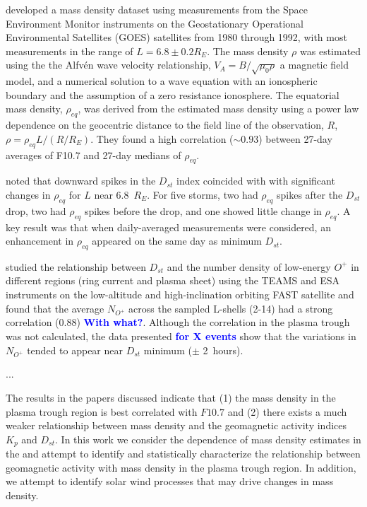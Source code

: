 \documentclass[10pt,twocolumn]{article}
\newcommand{\inote}[1]{\textcolor{blue}{\textbf{#1}}} %
\begin{document}
\cite{Takahashi2010} developed a mass density dataset using measurements from the Space Environment Monitor instruments on the Geostationary Operational Environmental Satellites (GOES) satellites from 1980 through 1992, with most measurements in the range of $L=6.8\pm0.2 R_E$. The mass density $\rho$ was estimated using the the Alfv\'en wave velocity relationship, $V_A=B/\sqrt{\mu_0\rho}$ a magnetic field model, and a numerical solution to a wave equation with an ionospheric boundary and the assumption of a zero resistance ionosphere.  The equatorial mass density, $\rho_{eq}$, was derived from the estimated mass density using a power law dependence on the geocentric distance to the field line of the observation, $R$, $\rho=\rho_{eq}L/(R/R_E)$.  They found a high correlation ($\sim 0.93$) between 27-day averages of F10.7 and 27-day medians of $\rho_{eq}$.

\cite{Takahashi2010} noted that downward spikes in the $D_{st}$ index coincided with with significant changes in $\rho_{eq}$ for $L$ near 6.8~$R_E$. For five storms, two had $\rho_{eq}$ spikes after the $D_{st}$ drop, two had $\rho_{eq}$ spikes before the drop, and one showed little change in $\rho_{eq}$.  A key result was that when daily-averaged measurements were considered, an enhancement in $\rho_{eq}$ appeared on the same day as minimum $D_{st}$.

\cite{Yao2008} studied the relationship between $D_{st}$ and the number density of low-energy $O^+$ in different regions (ring current and plasma sheet) using the TEAMS and ESA instruments on the low-altitude and high-inclination orbiting FAST satellite and found that the average $N_{O^+}$ across the sampled L-shells (2-14) had a strong correlation (0.88) \inote{With what?}.  Although the correlation in the plasma trough was not calculated, the data presented \inote{for X events} show that the variations in $N_{O^+}$ tended to appear near $D_{st}$ minimum ($\pm$ 2~hours).

\cite{Denton2016} ...

The results in the papers discussed indicate that (1) the mass density in the plasma trough region is best correlated with $F10.7$ and (2) there exists a much weaker relationship between mass density and the geomagnetic activity indices $K_p$ and $D_{st}$.  In this work we consider the dependence of mass density estimates in the \cite{Takahashi2010} and attempt to identify and statistically characterize the relationship between geomagnetic activity with mass density in the plasma trough region.  In addition, we attempt to identify solar wind processes that may drive changes in mass density. 
\end{document}
